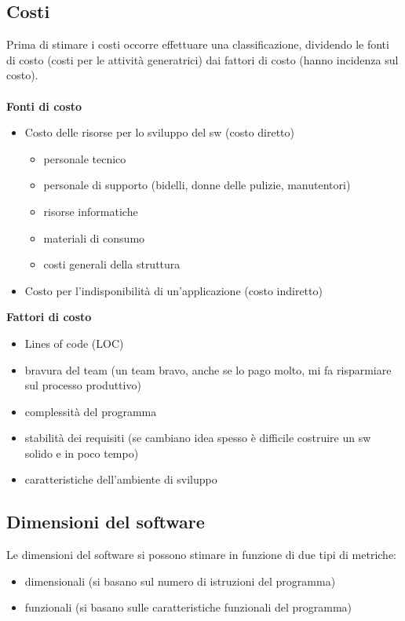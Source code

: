 \documentclass[a4paper,12pt]{report}
\begin{document}
	\subsection{Costi}
	Prima di stimare i costi occorre effettuare una classificazione, dividendo le fonti di costo (costi per le attività generatrici) dai fattori di costo (hanno incidenza sul costo). \\ \\
	\textbf{Fonti di costo}
	\begin{itemize}
		\item Costo delle risorse per lo sviluppo del sw (costo diretto)
		\begin{itemize}
			\item personale tecnico
			\item personale di supporto (bidelli, donne delle pulizie, manutentori)
			\item risorse informatiche
			\item materiali di consumo
			\item costi generali della struttura
		\end{itemize}
		\item Costo per l'indisponibilità di un'applicazione (costo indiretto)
	\end{itemize}
	\textbf{Fattori di costo}
	\begin{itemize}
		\item Lines of code (LOC)
		\item bravura del team (un team bravo, anche se lo pago molto, mi fa risparmiare sul processo produttivo)
		\item complessità del programma
		\item stabilità dei requisiti (se cambiano idea spesso è difficile costruire un sw solido e in poco tempo)
		\item caratteristiche dell'ambiente di sviluppo
	\end{itemize}
	\subsection{Dimensioni del software}
	Le dimensioni del software si possono stimare in funzione di due tipi di metriche:
	\begin{itemize}
		\item dimensionali (si basano sul numero di istruzioni del programma)
		\item funzionali (si basano sulle caratteristiche funzionali del programma)
	\end{itemize}
\end{document}
